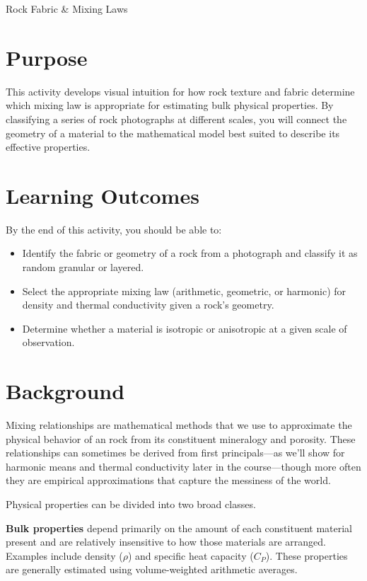 \begin{activity}{Rock Fabric \& Mixing Laws}

\section*{Purpose}

This activity develops visual intuition for how rock texture and fabric determine which mixing law is appropriate for estimating bulk physical properties. By classifying a series of rock photographs at different scales, you will connect the geometry of a material to the mathematical model best suited to describe its effective properties.

\section*{Learning Outcomes}

By the end of this activity, you should be able to:
\begin{itemize}
  \item Identify the fabric or geometry of a rock from a photograph and classify it as random granular or layered. 
  \item Select the appropriate mixing law (arithmetic, geometric, or harmonic) for density and thermal conductivity given a rock's geometry.
  \item Determine whether a material is isotropic or anisotropic at a given scale of observation.
\end{itemize}

\section*{Background}

Mixing relationships are mathematical methods that we use to approximate the physical behavior of an rock from its constituent mineralogy and porosity.  These relationships can sometimes be derived from first principals---as we'll show for harmonic means and thermal conductivity later in the course---though more often they are empirical approximations that capture the messiness of the world.

Physical properties can be divided into two broad classes.

\textbf{Bulk properties} depend primarily on the amount of each constituent material present and are relatively insensitive to how those materials are arranged. Examples include density ($\rho$) and specific heat capacity ($C_P$). These properties are generally estimated using volume-weighted arithmetic averages.


\end{activity}
